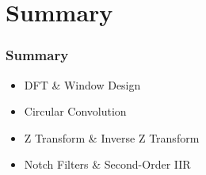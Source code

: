 \documentclass{beamer}
\begin{document}
\section{Summary}
\setcounter{subsection}{1}

\begin{frame}
  \frametitle{Summary}

  \begin{itemize}
  \item DFT \& Window Design
  \item Circular Convolution
  \item Z Transform \& Inverse Z Transform
  \item Notch Filters \& Second-Order IIR
  \end{itemize}
\end{frame}
\end{document}
